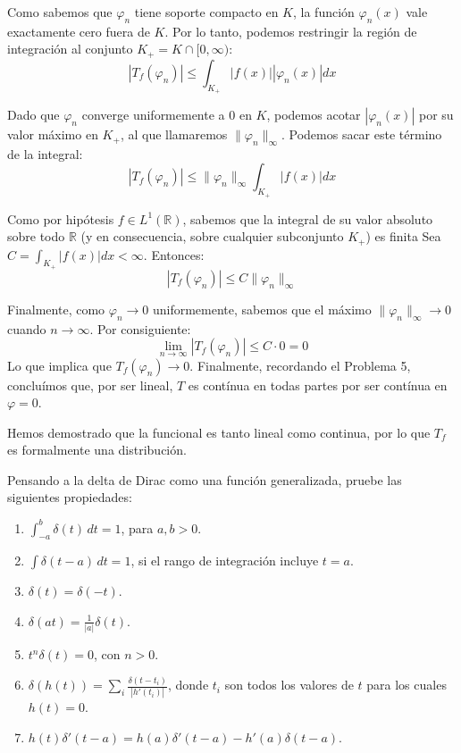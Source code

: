 \documentclass[11pt,spanish]{article}
\newcounter{problema}
\newcommand{\prob}{\stepcounter{problema} \vspace{.5cm} \noindent{\bf Problema \arabic{problema}: }}
\begin{document}
\begin{itemize}
Como sabemos que $\varphi_n$ tiene soporte compacto en $K$, la función $\varphi_n(x)$ vale exactamente cero fuera de $K$. Por lo tanto, podemos restringir la región de integración al conjunto $K_+ = K \cap [0, \infty)$:
$$|T_f(\varphi_n)| \le \int_{K_+} |f(x)| |\varphi_n(x)| dx$$

Dado que $\varphi_n$ converge uniformemente a 0 en $K$, podemos acotar $|\varphi_n(x)|$ por su valor máximo en $K_+$, al que llamaremos $\|\varphi_n\|_{\infty}$. Podemos sacar este término de la integral:
$$|T_f(\varphi_n)| \le \|\varphi_n\|_{\infty} \int_{K_+} |f(x)| dx$$

Como por hipótesis $f \in L^1(\mathbb{R})$, sabemos que la integral de su valor absoluto sobre todo $\mathbb{R}$ (y en consecuencia, sobre cualquier subconjunto $K_+$) es finita Sea $C = \int_{K_+} |f(x)| dx < \infty$. Entonces:
$$|T_f(\varphi_n)| \le C \|\varphi_n\|_{\infty}$$

Finalmente, como $\varphi_n \to 0$ uniformemente, sabemos que el máximo $\|\varphi_n\|_{\infty} \to 0$ cuando $n \to \infty$. Por consiguiente:
$$\lim_{n \to \infty} |T_f(\varphi_n)| \le C \cdot 0 = 0$$
Lo que implica que $T_f(\varphi_n) \to 0$.
Finalmente, recordando el Problema 5, conclu\'imos que, por ser lineal, $T$ es cont\'inua en todas partes por ser cont\'inua en $\varphi=0$.
\end{itemize}

Hemos demostrado que la funcional es tanto lineal como continua, por lo que $T_f$ es formalmente una distribución.



\prob Pensando a la delta de Dirac como una función generalizada, pruebe las siguientes propiedades:
\begin{enumerate}
\item $\displaystyle \int_{-a}^{b} \delta(t)\,dt = 1$, para $a,b>0$.
\item $\displaystyle \int \delta(t-a)\,dt = 1$, si el rango de integración incluye $t=a$.
\item $\delta(t) = \delta(-t)$.
\item $\displaystyle \delta(at) = \frac{1}{|a|}\delta(t)$.
\item $t^n\delta(t)=0$, con $n>0$.
\item $\displaystyle \delta(h(t)) = \sum_i \frac{\delta(t-t_i)}{|h'(t_i)|}$, donde $t_i$ son todos los valores de $t$ para los cuales $h(t)=0$.
\item $\displaystyle h(t)\delta'(t-a) = h(a)\delta'(t-a) - h'(a)\delta(t-a)$.
\end{enumerate}
\end{document}
